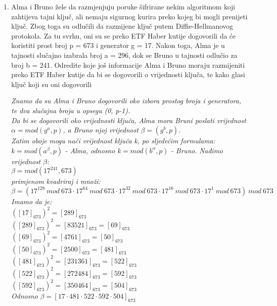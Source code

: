 \documentclass[12pt]{article}
\begin{document}
\begin{enumerate}
\begin{center}
        
        \vspace{0.25cm}
	    \end{center}
	    \item Alma i Bruno žele da razmjenjuju poruke šifrirane nekim algoritmom koji zahtijeva tajni ključ, ali nemaju sigurnog kurira preko kojeg bi mogli prenijeti ključ. Zbog toga su odlučili da razmijene ključ putem Diffie-Hellmanovog protokola. Za tu svrhu, oni su se preko ETF Haber kutije dogovorili da će koristiti prost broj p = 673 i generator g = 17. Nakon toga, Alma je u tajnosti slučajno izabrala broj a = 296, dok se Bruno u tajnosti odlučio za broj b = 241. Odredite koje još informacije Alma i Bruno moraju razmijeniti preko ETF Haber kutije da bi se dogovorili o vrijednosti ključa, te kako glasi ključ koji su oni dogovorili
        \begin{center}
        \textit{Znamo da su Alma i Bruno dogovorili oko izbora prostog broja i generatora, te dva slučajna broja u opsegu (0, p-1). \\Da bi se dogovorili oko vrijednosti ključa, Alma mora Bruni poslati vrijednost $\alpha = mod (g^a, p)$, a Bruno njoj vrijednost $\beta = (g^b, p)$.\\ Zatim oboje mogu naći vrijednost ključa k, po sljedećim formulama:\\$k = mod (a^\beta, p)$ - Alma, odnosno $k = mod (b^\alpha, p)$ - Bruno.}
        \textit{Nađimo vrijednost $\beta$:\\ $\beta = mod (17^{241}, 673)$\\ primjenom kvadriraj i množi:\\$\beta = (17^{128}\ mod\ 673\cdot17^{64}\ mod\ 673\cdot17^{32}\ mod\ 673\cdot17^{16}\ mod\ 673\cdot17^{1}\ mod\ 673)\ mod\ 673$\\Imamo da je:\\$([17]_{673})^2 = [289]_{673}$\\
        $([289]_{673})^2 = [83521]_{673} = [69]_{673} $\\
        $([69]_{673})^2 = [4761]_{673} = [50]_{673} $\\
        $([50]_{673})^2 = [2500]_{673} = [481]_{673} $\\
        $([481]_{673})^2 = [231361]_{673} = [522]_{673} $\\
        $([522]_{673})^2 = [272484]_{673} = [592]_{673} $\\
        $([592]_{673})^2 = [350464]_{673} = [504]_{673} $\\
        \vspace{0.15cm} Odnosno $\beta = [17\cdot481\cdot522\cdot592\cdot504]_{673}$\\\vspace{0.15cm}
}
\end{center}
\end{enumerate}
\end{document}
